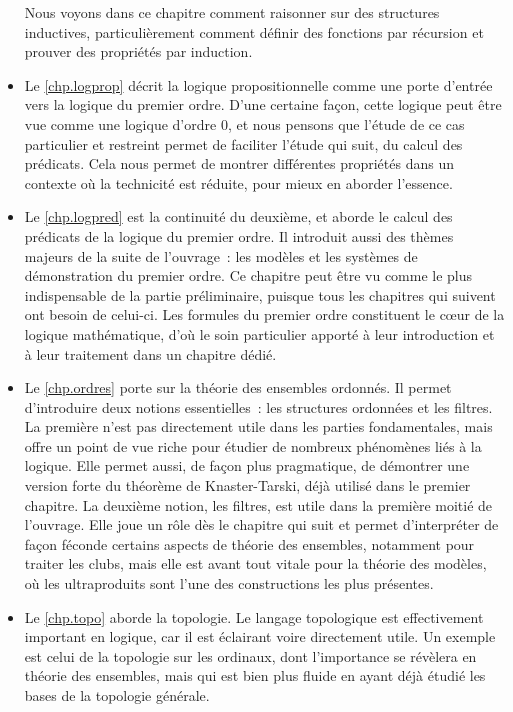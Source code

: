 \begin{itemize}
  Nous voyons dans ce chapitre comment raisonner sur des structures inductives,
  particulièrement comment définir des fonctions par récursion et prouver des
  propriétés par induction.
\item Le \cref{chp.logprop} décrit la logique propositionnelle comme une porte
  d'entrée vers la logique du premier ordre. D'une certaine façon, cette logique
  peut être vue comme une logique d'ordre $0$, et nous pensons que l'étude de ce
  cas particulier et restreint permet de faciliter l'étude qui suit, du calcul
  des prédicats. Cela nous permet de montrer différentes propriétés dans un
  contexte où la technicité est réduite, pour mieux en aborder l'essence.
\item Le \cref{chp.logpred} est la continuité du deuxième, et aborde le calcul
  des prédicats de la logique du premier ordre. Il introduit aussi des thèmes
  majeurs de la suite de l'ouvrage~: les modèles et les systèmes de
  démonstration du premier ordre. Ce chapitre peut être vu comme le plus
  indispensable de la partie préliminaire, puisque tous les chapitres qui
  suivent ont besoin de celui-ci. Les formules du premier ordre constituent le
  c\oe ur de la logique mathématique, d'où le soin particulier apporté à leur
  introduction et à leur traitement dans un chapitre dédié.
\item Le \cref{chp.ordres} porte sur la théorie des ensembles ordonnés. Il
  permet d'introduire deux notions essentielles~: les structures ordonnées et
  les filtres. La première n'est pas directement utile dans les parties
  fondamentales, mais offre un point de vue riche pour étudier de nombreux
  phénomènes liés à la logique. Elle permet aussi, de façon plus pragmatique, de
  démontrer une version forte du théorème de Knaster-Tarski, déjà utilisé dans
  le premier chapitre. La deuxième notion, les filtres, est utile dans la
  première moitié de l'ouvrage. Elle joue un rôle dès le chapitre qui suit et
  permet d'interpréter de façon féconde certains aspects de théorie des
  ensembles, notamment pour traiter les clubs, mais elle est avant tout
  vitale pour la théorie des modèles, où les ultraproduits sont l'une des
  constructions les plus présentes.
\item Le \cref{chp.topo} aborde la topologie. Le langage topologique est
  effectivement important en logique, car il est éclairant voire directement
  utile. Un exemple est celui de la topologie sur les ordinaux, dont
  l'importance se révèlera en théorie des ensembles, mais qui est bien plus
  fluide en ayant déjà étudié les bases de la topologie générale.


\end{itemize}
